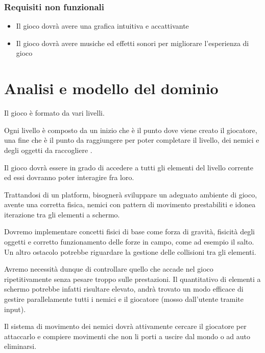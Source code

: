 \documentclass[a4paper,12pt]{report}
\begin{document}
    \subsubsection{Requisiti non funzionali}
    \begin{itemize}
        \item Il gioco dovrà avere una grafica intuitiva e accattivante
        \item Il gioco dovrà avere musiche ed effetti sonori per migliorare l'esperienza di gioco
    \end{itemize}

    \section{Analisi e modello del dominio}

    Il gioco è formato da vari livelli.

    Ogni livello è composto da un inizio che è il punto dove viene creato il giocatore, una fine che è il punto da raggiungere per poter completare il livello, dei nemici e degli oggetti da raccogliere .

    Il gioco dovrà essere in grado di accedere a tutti gli elementi del livello corrente ed essi dovranno poter interagire fra loro.

    Trattandosi di un platform, bisognerà sviluppare un adeguato ambiente di
    gioco, avente una corretta fisica, nemici con pattern di movimento prestabiliti
    e idonea iterazione tra gli elementi a schermo.

    Dovremo implementare concetti fisici di base come forza di gravità, fisicità
    degli oggetti e corretto funzionamento delle forze in campo, come ad esempio il salto.
    Un altro ostacolo potrebbe riguardare la gestione delle collisioni tra gli elementi.

    Avremo necessità dunque di controllare quello che accade nel gioco ripetitivamente senza pesare troppo sulle prestazioni. Il quantitativo di elementi a schermo potrebbe infatti risultare elevato, andrà trovato un modo efficace di gestire parallelamente tutti i nemici e il giocatore (mosso dall'utente tramite input).

    Il sistema di movimento dei nemici dovrà attivamente cercare il giocatore per attaccarlo e compiere movimenti che non li porti a uscire dal mondo o ad auto eliminarsi.
\end{document}
